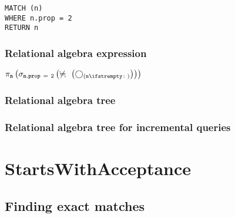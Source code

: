 \begin{lstlisting}
MATCH (n)
WHERE n.prop = 2
RETURN n
\end{lstlisting}

\subsubsection*{Relational algebra expression}

$\projection{\var{n}} \left(\selection{\mathtt{n.prop~=~2}} \left(\alldifferent{} \left(\getvertices{n}{}\right)\right)\right)$

\subsubsection*{Relational algebra tree}


\subsubsection*{Relational algebra tree for incremental queries}


\section{StartsWithAcceptance}

\subsection{Finding exact matches}

